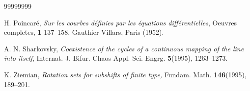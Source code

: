 \documentclass[12pt,reqno]{amsart}
\theoremstyle{definition}
\theoremstyle{remark}
\theoremstyle{assumption}
\numberwithin{equation}{section}
\begin{document}
\begin{thebibliography}{99999999}
	
	
	
	
	
	 H. Poincar\'e, \emph{Sur les courbes d\'efinies par
		les \'equations diff\'erentielles}, Oeuvres completes, \textbf{1}
	137--158, Gauthier-Villars, Paris (1952).
	
	
	 A. N. Sharkovsky, \emph{Coexistence of the
		cycles of a continuous mapping of the line into itself}, Internat.
	J. Bifur. Chaos Appl. Sci. Engrg. \textbf{5}(1995), 1263--1273.
	
	
	
	  K. Ziemian, \emph{Rotation sets for subshifts
		of finite type,} Fundam. Math. \textbf{146}(1995), 189--201.
	
	
	
\end{thebibliography}



	
\end{document}
